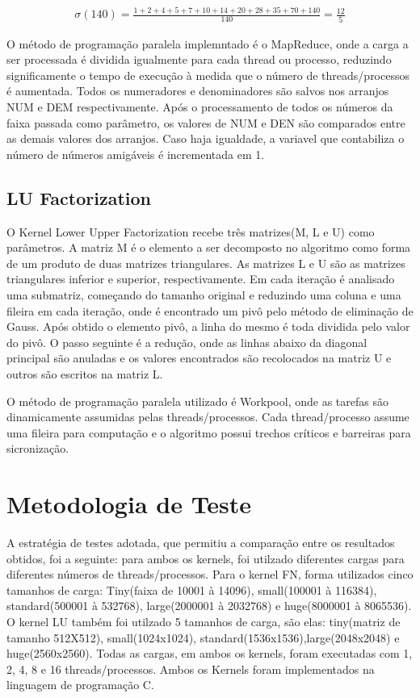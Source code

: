 \documentclass[12pt]{article}
\begin{document}
\begin{gather*}
{\sigma \left ( 140 \right )} = \frac{1+2+4+5+7+10+14+20+28+35+70+140}{140}=\frac{12}{5}
\end{gather*}


O método de programação paralela implemntado é o MapReduce, onde a carga a ser processada é dividida igualmente para cada thread ou processo, reduzindo significamente o tempo de execução à medida que o número de threads/processos é aumentada. Todos os numeradores e denominadores são salvos nos arranjos NUM e DEM respectivamente. Após o processamento de todos os números da faixa passada como parâmetro,
os valores de NUM e DEN são comparados entre as demais valores dos arranjos. Caso haja igualdade, a variavel que contabiliza o número de números amigáveis é incrementada em 1.

\subsection{LU Factorization}

O Kernel Lower Upper Factorization recebe três matrizes(M, L e U) como parâmetros. A matriz M é o elemento a ser decomposto no algoritmo como forma de um produto de duas matrizes triangulares. As matrizes L e U são as matrizes triangulares inferior e superior, respectivamente. Em cada iteração é analisado uma submatriz, começando do tamanho original e reduzindo uma coluna e uma fileira em cada iteração, onde é encontrado um pivô pelo método de eliminação de Gauss. Após obtido o elemento pivô, a linha do mesmo é toda dividida pelo valor do pivô. O passo seguinte é a redução, onde as linhas abaixo da diagonal principal são anuladas e os valores encontrados são recolocados na matriz U e outros são escritos na matriz L.

O método de programação paralela utilizado é Workpool, onde as tarefas são dinamicamente assumidas pelas threads/processos. Cada thread/processo assume uma fileira para computação e o algoritmo possui trechos críticos e barreiras para sicronização. 


\section{Metodologia de Teste}
A estratégia de testes adotada, que permitiu a comparação entre os resultados obtidos, foi a seguinte: para ambos os kernels, foi utilzado diferentes cargas para diferentes números de threads/processos. Para o kernel FN, forma utilizados cinco tamanhos de carga: Tiny(faixa de 10001 à 14096), small(100001 à 116384), standard(500001 à 532768), large(2000001 à 2032768) e huge(8000001 à 8065536). O kernel LU também foi utilzado 5 tamanhos de carga, são elas: tiny(matriz de tamanho 512X512), small(1024x1024), standard(1536x1536),large(2048x2048) e huge(2560x2560). Todas as cargas, em ambos os kernels, foram executadas com 1, 2, 4, 8 e 16 threads/processos. Ambos os Kernels foram implementados na linguagem de programação C.
\end{document}
